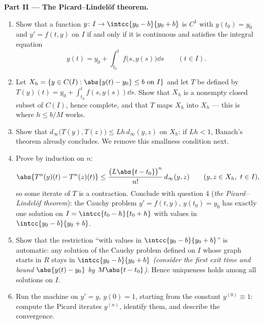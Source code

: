 \begin{problem}
\medskip
\noindent\textbf{Part II --- The Picard--Lindel\"of theorem.}
\begin{enumerate}[resume]
  \item Show that a function $y \colon I \to \intcc{y_0 - b}{y_0
        + b}$ is $C^1$ with $y(t_0) = y_0$ and $y' = f(t, y)$ on
        $I$ if and only if it is continuous and satisfies the
        integral equation
        \[
        y(t) = y_0 + \int_{t_0}^{t} f\bigl(s, y(s)\bigr)\dd s
        \qquad (t \in I).
        \]
  \item Let $X_h = \{y \in C(I) : \abs{y(t) - y_0} \leq b
        \text{ on } I\}$ and let $T$ be defined by $T(y)(t) =
        y_0 + \int_{t_0}^{t}f(s, y(s))\dd s$. Show that $X_h$ is
        a nonempty closed subset of $C(I)$, hence complete, and
        that $T$ maps $X_h$ into $X_h$ --- this is where $h \leq
        b/M$ works.
  \item Show that $d_\infty\bigl(T(y), T(z)\bigr) \leq
        Lh\,d_\infty(y, z)$ on $X_h$: if $Lh < 1$, Banach's
        theorem already concludes. We remove this smallness
        condition next.
  \item Prove by induction on $n$:
        \[
        \abs{T^n(y)(t) - T^n(z)(t)} \leq
        \frac{\bigl(L\abs{t - t_0}\bigr)^n}{n!}\,
        d_\infty(y, z) \qquad (y, z \in X_h,\ t \in I),
        \]
        so some iterate of $T$ is a contraction. Conclude with
        question 4 (\emph{the Picard--Lindel\"of theorem}): the
        Cauchy problem $y' = f(t,y)$, $y(t_0) = y_0$ has exactly
        one solution on $I = \intcc{t_0 - h}{t_0 + h}$ with
        values in $\intcc{y_0 - b}{y_0 + b}$.
  \item Show that the restriction ``with values in $\intcc{y_0 -
        b}{y_0 + b}$'' is automatic: any solution of the Cauchy
        problem defined on $I$ whose graph starts in $R$ stays
        in $\intcc{y_0 - b}{y_0 + b}$ \emph{(consider the first
        exit time and bound $\abs{y(t) - y_0}$ by $M\abs{t -
        t_0}$)}. Hence uniqueness holds among all solutions on
        $I$.
  \item Run the machine on $y' = y$, $y(0) = 1$, starting from
        the constant $y^{(0)} \equiv 1$: compute the Picard
        iterates $y^{(n)}$, identify them, and describe the
        convergence.
\end{enumerate}


\end{problem}
